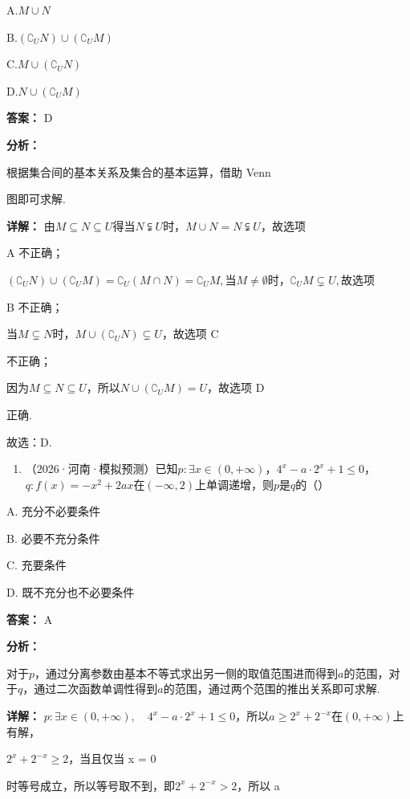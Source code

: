 \documentclass[11pt,a4paper]{ctexart}
\begin{document}
A.\(M \cup N\)

B.\((\complement_U N) \cup (\complement_U M)\)

C.\(M \cup (\complement_U N)\)

D.\(N \cup (\complement_U M)\)

\textbf{答案：}
D

\textbf{分析：}

根据集合间的基本关系及集合的基本运算，借助 Venn

图即可求解.

\textbf{详解：}
由\(M \subseteq N \subseteq U\)得当\(N \subsetneqq U\)时，\(M \cup N = N \subsetneqq U\)，故选项

A 不正确；

\((\complement_U N) \cup (\complement_U M) = \complement_U(M \cap N) = \complement_U M,\)当\(M \neq \emptyset\)时，\(\complement_U M \subsetneq U,\)故选项

B 不正确；

当\(M \subsetneq N\)时，\(M \cup (\complement_U N) \subsetneq U\)，故选项 C

不正确；

因为\(M \subseteq N \subseteq U\)，所以\(N \cup (\complement_U M) = U\)，故选项 D

正确.

故选：D.

\begin{enumerate}[label=\arabic*., leftmargin=*, start=13]
\item （2026·河南·模拟预测）已知\(p: \exists x \in (0, +\infty)\)，\(4^x - a \cdot 2^x + 1 \leq 0\)，\(q: f(x) = -x^2 + 2ax\)在\((- \infty, 2)\)上单调递增，则\(p\)是\(q\)的（）
\end{enumerate}

A. 充分不必要条件

B. 必要不充分条件

C. 充要条件

D. 既不充分也不必要条件

\textbf{答案：}
A

\textbf{分析：}

对于\(p\)，通过分离参数由基本不等式求出另一侧的取值范围进而得到\(a\)的范围，对于\(q\)，通过二次函数单调性得到\(a\)的范围，通过两个范围的推出关系即可求解.

\textbf{详解：}
\(p:\exists x\in(0,+\infty),\quad4^{x}-a\cdot2^{x}+1\leq0\)，所以\(a\geq2^{x}+2^{-x}\)在\((0,+\infty)\)上有解，

\(2^{x} + 2^{-x} \geq 2\)，当且仅当 x = 0

时等号成立，所以等号取不到，即\(2^{x} + 2^{-x} > 2\)，所以 a
\end{document}
